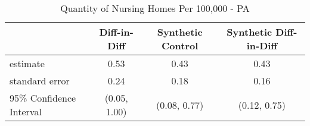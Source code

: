 \begin{table}[ht]
\centering
\begin{tabular}{lccc}
  \hline
 & Diff-in-Diff & Synthetic Control & Synthetic Diff-in-Diff \\ 
  \hline
estimate & 0.53 & 0.43 & 0.43 \\ 
  standard error & 0.24 & 0.18 & 0.16 \\ 
  95\% Confidence Interval & (0.05, 1.00) & (0.08, 0.77) & (0.12, 0.75) \\ 
   \hline
\end{tabular}
\caption{Quantity of Nursing Homes Per 100,000 - PA} 
\end{table}
